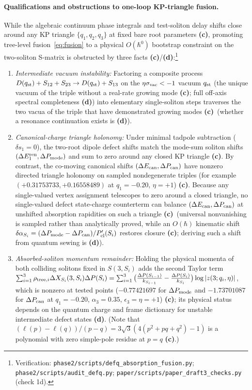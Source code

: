 \documentclass[11pt,a4paper]{article}
\newcommand{\lab}[1]{{\normalfont\sffamily\footnotesize\bfseries(#1)}}
\newcommand{\Lc}{\lab{c}}
\newcommand{\Ld}{\lab{d}}
\newcommand{\scr}[1]{\nolinkurl{#1}}
\newcommand{\chk}[1]{\footnote{\raggedright Verification: #1.}}
\newcommand{\hb}{\hbar}
\theoremstyle{remark}
\begin{document}
\paragraph{Qualifications and obstructions to one-loop KP-triangle fusion.} While the algebraic continuum phase integrals and test-soliton delay shifts close around any KP triangle $\{q_1,q_2,q_3\}$ at fixed bare root parameters \Lc, promoting tree-level fusion~\eqref{eq:fusion} to a physical $O(\hb^0)$ bootstrap constraint on the two-soliton S-matrix is obstructed by three facts \Lc/\Ld:\chk{\scr{phase2/scripts/defq_absorption_fusion.py}; \scr{phase2/scripts/audit_defq.py}; \scr{paper/scripts/paper_draft3_checks.py} (check 1d)}
\begin{enumerate}
\item \emph{Intermediate vacuum instability:} Factoring a composite process $D(q_{\rm st})+S_{12}+S_{23}\to D(q_{\rm st})+S_{13}$ on the $\eta\sigma_{\rm vac}<-1$ vacuum $q_{\rm st}$ (the unique vacuum of the triple without a real-rate growing mode \Lc; full off-axis spectral completeness \Ld) into elementary single-soliton steps traverses the two vacua of the triple that have demonstrated growing modes \Lc\ (whether a resonance continuation exists is \Ld).
\item \emph{Canonical-charge triangle holonomy:} Under minimal tadpole subtraction ($\delta s_1=0$), the two-root dipole defect shifts match the mode-sum soliton shifts $(\Delta E_1^{\rm ren},\Delta P_{\rm mode})$ and sum to zero around any closed KP triangle \Lc. By contrast, the co-moving canonical shifts $(\Delta E_{\rm can},\Delta P_{\rm can})$ have nonzero directed triangle holonomy on sampled nondegenerate triples (for example $(+0.31753733,+0.16558489)$ at $q_1=-0.20$, $\eta=+1$) \Lc. Because any single-valued vertex assignment telescopes to zero around a closed triangle, no single-valued defect state-charge counterterm can balance $(\Delta E_{\rm can},\Delta P_{\rm can})$ at unshifted absorption rapidities on such a triangle \Lc\ (universal nonvanishing is sampled rather than analytically proved, while an $O(\hb)$ kinematic shift $\delta\alpha_{S_i}=(\Delta P_{\rm mode}-\Delta P_{\rm can})/P_{\rm cl}'(S_i)$ restores closure \Lc; deriving such a shift from quantum sewing is \Ld).
\item \emph{Absorbed-soliton momentum remainder:} Holding the physical momenta of both colliding solitons fixed in $S(3,S_i)$ adds the second Taylor term $\sum_{i=1}^3\rho_{{\rm tree},i}\Delta X_{S_i}(3,S_i)\Delta P(S_i)=\sum_{i=1}^3\big(\frac{\Delta P(S_{i-1})}{k_{S_{i-1}}}-\frac{\Delta P(S_i)}{k_{S_i}}\big)\log|z(3;q_i,\eta)|$, which is nonzero at tested points ($-0.77421697$ for $\Delta P_{\rm mode}$ and $-1.73701087$ for $\Delta P_{\rm can}$ at $q_1=-0.20$, $\alpha_3=0.35$, $\epsilon_3=\eta=+1$) \Lc; its physical status depends on the quantum charge and frame dictionary for unstable intermediate defect states \Ld. (Note that $(\ell(p)-\ell(q))/(p-q)=3\sqrt3(4(p^2+pq+q^2)-1)$ is a polynomial with zero simple-pole residue at $p=q$ \Lc.)
\end{enumerate}
\end{document}
